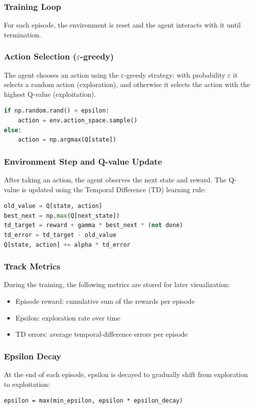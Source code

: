 \documentclass[a4paper,12pt]{article}
\begin{document}
\subsubsection{Training Loop}
For each episode, the environment is reset and the agent interacts with it until termination.
\subsubsection{Action Selection ($\varepsilon$-greedy)}
The agent chooses an action using the $\varepsilon$-greedy strategy: with probability $\varepsilon$ it selects a random action (exploration), and otherwise it selects the action with the highest Q-value (exploitation).
\begin{lstlisting}[language=Python]
if np.random.rand() < epsilon:
    action = env.action_space.sample()
else:
    action = np.argmax(Q[state])
\end{lstlisting}
\subsubsection{Environment Step and Q-value Update}
After taking an action, the agent observes the next state and reward. The Q-value is updated using the Temporal Difference (TD) learning rule:
\begin{lstlisting}[language=Python]
old_value = Q[state, action]
best_next = np.max(Q[next_state])
td_target = reward + gamma * best_next * (not done)
td_error = td_target - old_value
Q[state, action] += alpha * td_error
\end{lstlisting}
\subsubsection{Track Metrics}
During the training, the following metrics are stored for later visualization:
\begin{itemize}
    \item Episode reward: cumulative sum of the rewards per episode
    \item Epsilon: exploration rate over time
    \item TD errors: average temporal-difference errors per episode
\end{itemize}
\subsubsection{Epsilon Decay}
At the end of each episode, epsilon is decayed to gradually shift from exploration to exploitation:
\begin{lstlisting}
epsilon = max(min_epsilon, epsilon * epsilon_decay)
\end{lstlisting}
\end{document}
